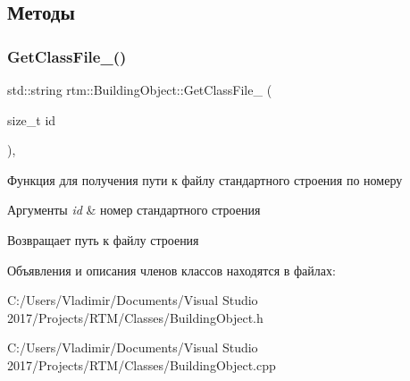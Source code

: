 \subsection{Методы}
\mbox{\label{classrtm_1_1_building_object_a03d48aa04f03da02b6a006b7a888dca5}} 
\subsubsection{\texorpdfstring{Get\+Class\+File\+\_\+()}{GetClassFile\_()}}
{\footnotesize\ttfamily std\+::string rtm\+::\+Building\+Object\+::\+Get\+Class\+File\+\_\+ (\begin{DoxyParamCaption}\item[{size\+\_\+t}]{id }\end{DoxyParamCaption})\hspace{0.3cm}{\ttfamily [static]}, {\ttfamily [private]}}

Функция для получения пути к файлу стандартного строения по номеру 
\begin{DoxyParams}{Аргументы}
{\em id} & номер стандартного строения \\
\hline
\end{DoxyParams}
\begin{DoxyReturn}{Возвращает}
путь к файлу строения 
\end{DoxyReturn}


Объявления и описания членов классов находятся в файлах\+:\begin{DoxyCompactItemize}
\item 
C\+:/\+Users/\+Vladimir/\+Documents/\+Visual Studio 2017/\+Projects/\+R\+T\+M/\+Classes/Building\+Object.\+h\item 
C\+:/\+Users/\+Vladimir/\+Documents/\+Visual Studio 2017/\+Projects/\+R\+T\+M/\+Classes/Building\+Object.\+cpp\end{DoxyCompactItemize}
